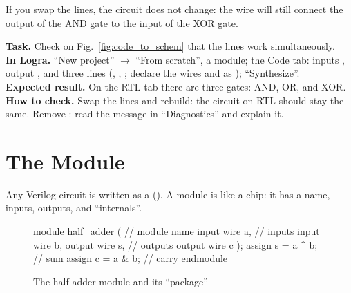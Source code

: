 If you swap the lines, the circuit does not change: the wire  will still
connect the output of the AND gate to the input of the XOR gate.

\begin{diybox}
\textbf{Task.} Check on Fig.~\ref{fig:code_to_schem} that the  lines work simultaneously.\\
\textbf{In Logra.} ``New project'' $\to$ ``From scratch'', a  module; the Code tab: inputs , output , and three  lines (, , ; declare the wires  and  as ); ``Synthesize''.\\
\textbf{Expected result.} On the RTL tab there are three gates: AND, OR, and XOR.\\
\textbf{How to check.} Swap the lines and rebuild: the circuit on RTL should stay the same.  Remove : read the message in ``Diagnostics'' and explain it.
\end{diybox}

\section{The Module}

Any Verilog circuit is written as a  (). A module
is like a chip: it has a name, inputs, outputs, and ``internals''.

\begin{figure}[H]
\centering
\begin{minipage}{0.52\textwidth}
\begin{vcode}
module half_adder (   // module name
    input  wire a,    // inputs
    input  wire b,
    output wire s,    // outputs
    output wire c
);
    assign s = a ^ b; // sum
    assign c = a & b; // carry
endmodule
\end{vcode}
\end{minipage}\hfill
\begin{minipage}{0.44\textwidth}
\centering
{}
\end{minipage}
\caption{The half-adder module and its ``package''}
\end{figure}

